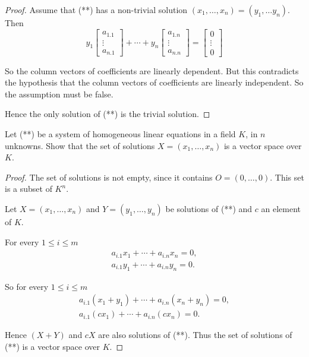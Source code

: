 \begin{proof}
    Assume that (**) has a non-trivial solution $(x_{1}, \ldots, x_{n}) = (y_{1},\ldots y_{n})$. Then
    \[
        y_{1}\begin{bmatrix}
            a_{1.1} \\
            \vdots  \\
            a_{n.1}
        \end{bmatrix}
        + \cdots +
        y_{n}\begin{bmatrix}
            a_{1.n} \\
            \vdots  \\
            a_{n.n}
        \end{bmatrix}
        = \begin{bmatrix}
            0      \\
            \vdots \\
            0
        \end{bmatrix}
    \]

    So the column vectors of coefficients are linearly dependent. But this contradicts the hypothesis that the column vectors of coefficients are linearly independent. So the assumption must be false.

    Hence the only solution of (**) is the trivial solution.
\end{proof}

\begin{exercise}
    Let (**) be a system of homogeneous linear equations in a field $K$, in $n$ unknowns. Show that the set of solutions $X = (x_{1},\ldots,x_{n})$ is a vector space over $K$.
\end{exercise}

\begin{proof}
    The set of solutions is not empty, since it contains $O = (0,\ldots, 0)$. This set is a subset of $K^{n}$.

    Let $X = (x_{1}, \ldots, x_{n})$ and $Y = (y_{1}, \ldots, y_{n})$ be solutions of (**) and $c$ an element of $K$.

    For every $1\le i \le m$
    \[
        \begin{split}
            a_{i.1}x_{1} + \cdots + a_{i.n}x_{n} = 0, \\
            a_{i.1}y_{1} + \cdots + a_{i.n}y_{n} = 0.
        \end{split}
    \]

    So for every $1\le i \le m$
    \[
        \begin{split}
            a_{i.1}(x_{1} + y_{1}) + \cdots + a_{i.n}(x_{n} + y_{n}) = 0, \\
            a_{i.1}(cx_{1}) + \cdots + a_{i.n}(cx_{n}) = 0.
        \end{split}
    \]

    Hence $(X + Y)$ and $cX$ are also solutions of (**). Thus the set of solutions of (**) is a vector space over $K$.
\end{proof}

